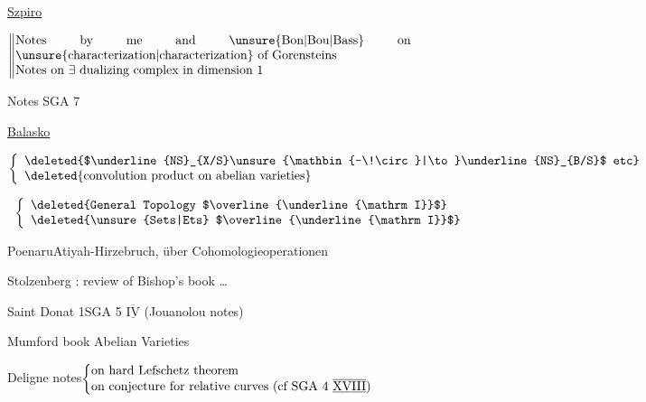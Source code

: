 \uline{Szpiro}

\(\left\Vert\begin{array}{@{}p{.91\linewidth}@{}}Notes by me and \unsure{Bon|Bou|Bass} on \unsure{characterization|characterization} of Gorensteins\\Notes on $\exists$ dualizing complex in dimension 1\end{array}\right.\)

Notes SGA 7




\uline{Balasko}

\quad\(\left\{\begin{array}{l}\text{\deleted{$\underline{NS}_{X/S}\unsure{\mathbin{-\!\circ}|\to}\underline{NS}_{B/S}$ etc}}\\\text{\deleted{convolution product on abelian varieties}}\end{array}\right.\)




\qquad {}\ \(\left\{\begin{array}{l}\text{\deleted{General Topology $\overline{\underline{\mathrm I}}$}}\\\text{\deleted{\unsure{Sets|Ets} $\overline{\underline{\mathrm I}}$}}\end{array}\right.\)

Poenaru\qquad Atiyah-Hirzebruch, über Cohomologieoperationen\unsure{-|\ldots} \unsure{---|\ldots}

Stolzenberg : review of Bishop's book \ldots



Saint Donat 1\qquad SGA 5 $\overline{\underline{\mathrm{IV}}}$ (Jouanolou notes)


Mumford book Abelian Varieties

Deligne notes\qquad \(\left\{\begin{array}{@{}p{.67\linewidth}@{}}on hard Lefschetz theorem\\on conjecture for relative curves (cf SGA 4 $\overline{\underline{\mathrm{XVIII}}}$)\end{array}\right.\)

\clearpage
